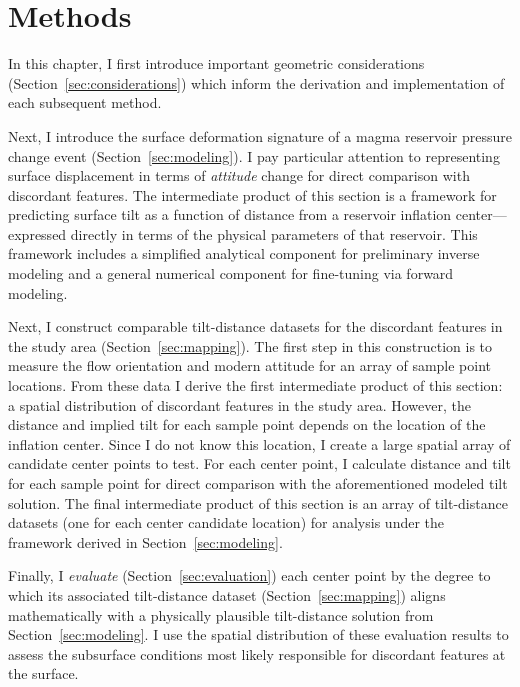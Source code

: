 \chapter{Methods}\label{cha:methods}

In this chapter, I first introduce important geometric considerations (Section~\ref{sec:considerations}) which inform the derivation and implementation of each subsequent method.

Next, I introduce the surface deformation signature of a magma reservoir pressure change event (Section~\ref{sec:modeling}). I pay particular attention to representing surface displacement in terms of \emph{attitude} change for direct comparison with discordant features. The intermediate product of this section is a framework for predicting surface tilt as a function of distance from a reservoir inflation center---expressed directly in terms of the physical parameters of that reservoir. This framework includes a simplified analytical component for preliminary inverse modeling and a general numerical component for fine-tuning via forward modeling.

Next, I construct comparable tilt-distance datasets for the discordant features in the study area (Section~\ref{sec:mapping}). The first step in this construction is to measure the flow orientation and modern attitude for an array of sample point locations. From these data I derive the first intermediate product of this section: a spatial distribution of discordant features in the study area. However, the distance and implied tilt for each sample point depends on the location of the inflation center. Since I do not know this location, I create a large spatial array of candidate center points to test. For each center point, I calculate distance and tilt for each sample point for direct comparison with the aforementioned modeled tilt solution. The final intermediate product of this section is an array of tilt-distance datasets (one for each center candidate location) for analysis under the framework derived in Section~\ref{sec:modeling}.

Finally, I \emph{evaluate} (Section~\ref{sec:evaluation}) each center point by the degree to which its associated tilt-distance dataset (Section~\ref{sec:mapping}) aligns mathematically with a physically plausible tilt-distance solution from Section~\ref{sec:modeling}. I use the spatial distribution of these evaluation results to assess the subsurface conditions most likely responsible for discordant features at the surface.




